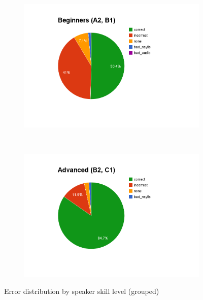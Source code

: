 			
			\begin{figure}[htb]
				\centering
				\begin{subfigure}[t]{0.5\textwidth}
					\includegraphics[width=\textwidth]{img/annotation/beginnerPie}
					\caption{}
					\label{fig:levelgroupspies:beg}
				\end{subfigure}%
				~
				\begin{subfigure}[t]{0.5\textwidth}
					\includegraphics[width=\textwidth]{img/annotation/advancedPie}
					\caption{}
					\label{fig:levelgroupspies:adv}
				\end{subfigure}%
				\caption{Error distribution by speaker skill level (grouped)}
				\label{fig:levelgroupspies}
			\end{figure}	
			
